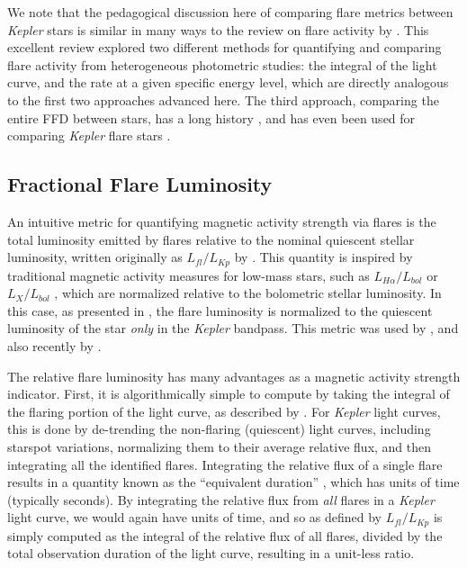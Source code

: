 \documentclass[preprint2]{aastex62}
\newcommand{\Kepler}{\textsl{Kepler}\xspace}
\begin{document}
We note that the pedagogical discussion here of comparing flare metrics between \Kepler stars is similar in many ways to the review on flare activity by \citet{kunkel1975}. This excellent review explored two different methods for quantifying and comparing flare activity from heterogeneous photometric studies: the integral of the light curve, and the rate at a given specific energy level, which are directly analogous to the first two approaches advanced here. The third approach, comparing the entire FFD between stars, has a long history \citep[e.g. see Fig. 17 of][]{lme1976}, and has even been used for comparing \Kepler flare stars \citep[e.g.][]{ramsay2013,hawley2014}.




\subsection{Fractional Flare Luminosity}
\label{sec:fracL}

An intuitive metric for quantifying magnetic activity strength via flares is the total luminosity emitted by flares relative to the nominal quiescent stellar luminosity, written originally as $L_{fl}/L_{Kp}$ by \citet{lurie2015}. This quantity is inspired by traditional magnetic activity measures for low-mass stars, such as $L_{H\alpha}/L_{bol}$  \citep{walkowicz2004} or $L_X/L_{bol}$ \citep{pallavicini1981}, which are normalized relative to the bolometric stellar luminosity. In this case, as presented in \citet{lurie2015}, the flare luminosity is normalized to the quiescent luminosity of the star {\it only} in the \Kepler bandpass. This metric was used by \citet{davenport2016}, and also recently by \citet{yang2017}. %


The relative flare luminosity has many advantages as a magnetic activity strength indicator. First, it is algorithmically simple to compute by taking the integral of the flaring portion of the light curve, as described by \citet{kunkel1975}. For \Kepler light curves, this is done by de-trending the non-flaring (quiescent) light curves, including starspot variations, normalizing them to their average relative flux, and then integrating all the identified flares. Integrating the relative flux of a single flare results in a quantity known as the ``equivalent duration'' \citep[e.g. see][]{huntwalker2012}, which has units of time (typically seconds). By integrating the relative flux from {\it all} flares in a \Kepler light curve, we would again have units of time, and so as defined by \citet{lurie2015} $L_{fl}/L_{Kp}$ is simply computed as the integral of the relative flux of all flares, divided by the total observation duration of the light curve, resulting in a unit-less ratio.
\end{document}
